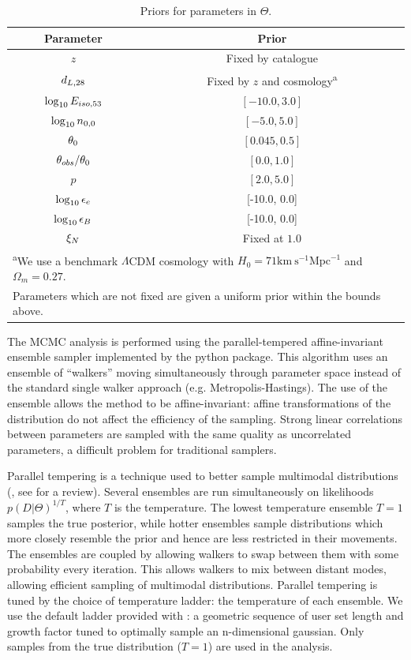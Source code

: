 \begin{table}
\begin{center}
\begin{tabular}{cc}
\hline \hline
Parameter & Prior \\[2pt]
\hline
$z$ & Fixed by catalogue \\[2pt]
$d_{L,28}$ & Fixed by $z$ and cosmology\textsuperscript{a} \\[2pt]
$\log_{10} E_{iso, 53}$ & $[-10.0,3.0]$  \\[2pt]
$\log_{10} n_{0, 0}$ & $[-5.0,5.0]$ \\[2pt]
$\theta_0 $& $[0.045,0.5]$ \\[2pt]
 $\theta_{obs} / \theta_0$ & $[0.0,1.0]$ \\[2pt]
$p$ & $[2.0, 5.0]$ \\[2pt]
 $\log_{10} \epsilon_e$ & [-10.0, 0.0] \\[2pt]
$\log_{10} \epsilon_B$ & [-10.0, 0.0] \\[2pt]
$\xi_N$ & Fixed at $1.0$ \\[2pt]
\hline
\multicolumn{2}{l}{\textsuperscript{a}We use a benchmark $\Lambda$CDM cosmology with $H_0 = 71\text{km}\ \text{s}^{-1} \text{Mpc}^{-1}$ and $\Omega_m = 0.27$.} \\
\multicolumn{2}{l}{Parameters which are not fixed are given a uniform prior within the bounds above.}
\end{tabular}
\end{center}
\caption{Priors for parameters in $\Theta$. }
\end{table}


The MCMC analysis is performed using the parallel-tempered affine-invariant ensemble sampler implemented by the \emcee{} python package.  This algorithm uses an ensemble of ``walkers'' moving simultaneously through parameter space instead of the standard single walker approach (e.g. Metropolis-Hastings).  The use of the ensemble allows the method to be affine-invariant: affine transformations of the distribution do not affect the efficiency of the sampling.  Strong linear correlations between parameters are sampled with the same quality as uncorrelated parameters, a difficult problem for traditional samplers.  

Parallel tempering is a technique used to better sample multimodal distributions (\citet{Swendsen86, Geyer91}, see \citet{Earl05} for a review).  Several ensembles are run simultaneously on likelihoods $p(D|\Theta)^{1/T}$, where $T$ is the temperature.  The lowest temperature ensemble $T=1$ samples the true posterior, while hotter ensembles sample distributions which more closely resemble the prior and hence are less restricted in their movements.  The ensembles are coupled by allowing walkers to swap between them with some probability every iteration.  This allows walkers to mix between distant modes, allowing efficient sampling of multimodal distributions.  Parallel tempering is tuned by the choice of temperature ladder: the temperature of each ensemble.  We use the default ladder provided with \emcee{}: a geometric sequence of user set length and growth factor tuned to optimally sample an n-dimensional gaussian.  Only samples from the true distribution ($T=1$) are used in the analysis.

